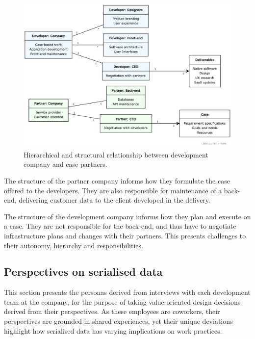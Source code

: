 \documentclass[../report.tex]{subfiles}
\begin{document}
\begin{figure}[H]
\centering
\includegraphics[width=\linewidth]{figures/organisation.pdf}
\caption{Hierarchical and structural relationship between development company and case partners.}
\label{fig:organisation}
\end{figure}

The structure of the partner company informs how they formulate the case offered to the developers. They are also responsible for maintenance of a back-end, delivering customer data to the client developed in the delivery.

The structure of the development company informs how they plan and execute on a case. They are not responsible for the back-end, and thus have to negotiate infrastructure plans and changes with their partners. This presents challenges to their autonomy, hierarchy and responsibilities.

\subsection{Perspectives on serialised data}

This section presents the personas derived from interviews with each development team at the company, for the purpose of taking value-oriented design decisions derived from their perspectives. As these employees are coworkers, their perspectives are grounded in shared experiences, yet their unique deviations highlight how serialised data has varying implications on work practices.
\end{document}
